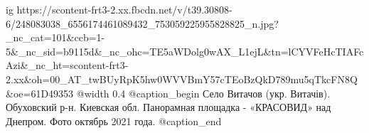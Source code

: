  
 
 
 
 

\ifcmt
  ig https://scontent-frt3-2.xx.fbcdn.net/v/t39.30808-6/248083038_6556174461089432_753059225955828825_n.jpg?_nc_cat=101&ccb=1-5&_nc_sid=b9115d&_nc_ohc=TE5aWDolg0wAX_L1ejL&tn=lCYVFeHcTIAFcAzi&_nc_ht=scontent-frt3-2.xx&oh=00_AT_twBUyRpK5hw0WVVBmY57cTEoBzQkD789mu5qTkcFN8Q&oe=61D49353
  @width 0.4
  @caption_begin
    Село Витачов (укр. Витачів). Обуховский р-н. Киевская обл. 
    Панорамная площадка - «КРАСОВИД» над Днепром. Фото октябрь 2021 года.
  @caption_end
\fi
